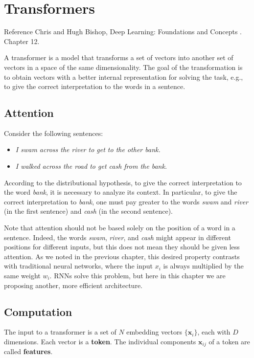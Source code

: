 \chapter{Transformers}
\begin{note}{Reference}
    Chris and Hugh Bishop, Deep Learning: Foundations and Concepts \cite{bishop2023deep}.
    Chapter 12.
\end{note}

A transformer is a model that transforms a set of vectors into another set of vectors in a space of the same dimensionality. The goal of the transformation is to obtain vectors with a better internal representation for solving the task, e.g., to give the correct interpretation to the words in a sentence.

\section{Attention}
Consider the following sentences:
\begin{itemize}
    \item \textit{I swam across the river to get to the other bank.}
    \item \textit{I walked across the road to get cash from the bank.}
\end{itemize}

According to the distributional hypothesis, to give the correct interpretation to the word \textit{bank}, it is necessary to analyze its context. 
In particular, to give the correct interpretation to \textit{bank}, one must pay greater  to the words \textit{swam} and \textit{river} (in the first sentence) and \textit{cash} (in the second sentence).

Note that attention should not be based solely on the position of a word in a sentence. Indeed, the words \textit{swam}, \textit{river}, and \textit{cash} might appear in different positions for different inputs, but this does not mean they should be given less attention. 
As we noted in the previous chapter, this desired property contrasts with traditional neural networks, where the input $x_i$ is always multiplied by the same weight $w_i$. 
RNNs solve this problem, but here in this chapter we are proposing another, more efficient architecture.

\section{Computation}
The input to a transformer is a set of $N$ embedding vectors $\{\mathbf{x}_i\}$, each with $D$ dimensions. 
Each vector is a \textbf{token}.
The individual components $\mathbf{x}_{ij}$ of a token are called \textbf{features}.

